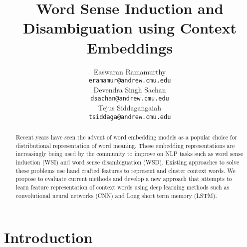 \documentclass{article}
\title{Word Sense Induction and Disambiguation using Context Embeddings}
\author{
  Easwaran Ramamurthy \\
  \texttt{eramamur@andrew.cmu.edu} \\
   \And
  Devendra Singh Sachan \\
  \texttt{dsachan@andrew.cmu.edu} \\
  \AND
  Tejus Siddagangaiah \\
  \texttt{tsiddaga@andrew.cmu.edu} \\
}
\begin{document}

\maketitle

\begin{abstract}
Recent years have seen the advent of word embedding models as a popular choice for distributional representation of word meaning. These embedding representations are increasingly being used by the community to improve on NLP tasks such as word sense induction (WSI) and word sense disambiguation (WSD). Existing approaches to solve these problems use hand crafted features to represent and cluster context words. We propose to evaluate current methods and develop a new approach that attempts to learn feature representation of context words using deep learning methods such as convolutional neural networks (CNN) and Long short term memory (LSTM).
\end{abstract}

\section{Introduction}
\end{document}
